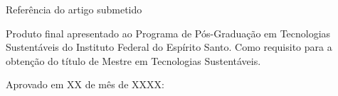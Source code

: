 
%
% 
%
\begin{folhadeaprovacao}

  \begin{center}
    {\ABNTEXchapterfont\imprimirautor}

    \vspace*{\fill}\vspace*{\fill}
    \begin{center}
      Referência do artigo submetido
    \end{center}
    \vspace*{\fill}
    
    \hspace{.45\textwidth}
    \begin{minipage}{.5\textwidth}
        Produto final apresentado ao Programa de Pós-Graduação em Tecnologias Sustentáveis do Instituto Federal do Espírito Santo. Como requisito para a obtenção do título de Mestre em Tecnologias Sustentáveis.
    \end{minipage}%
    \vspace*{\fill}
   \end{center}
        
   Aprovado em  XX de mês de XXXX:

        
\end{folhadeaprovacao}

